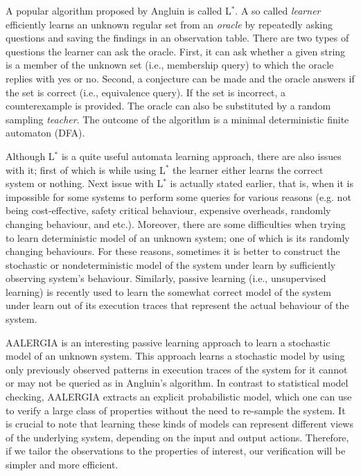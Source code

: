 \documentclass[
a4paper,
12pt
]{scrartcl}
\begin{document}

\par A popular algorithm proposed by Angluin \cite{Angluin.1987} is called L$^*$. A so called \textit{learner} efficiently learns an unknown regular set from an \textit{oracle} by repeatedly asking questions and saving the findings in an observation table. There are two types of questions the learner can ask the oracle. First, it can ask whether a given string is a member of the unknown set (i.e., membership query) to which the oracle replies with yes or no. Second, a conjecture can be made and the oracle answers if the set is correct (i.e., equivalence query). If the set is incorrect, a counterexample is provided. The oracle can also be substituted by a random sampling \textit{teacher}. The outcome of the algorithm is a minimal deterministic finite automaton (DFA).

\par Although L$^*$ is a quite useful automata learning approach, there are also issues with it; first of which is while using L$^*$ the learner either learns the correct system or nothing. Next issue with L$^*$ is actually stated earlier, that is, when it is impossible for some systems to perform some queries for various reasons (e.g. not being cost-effective, safety critical behaviour, expensive overheads, randomly changing behaviour, and etc.). Moreover, there are some difficulties when trying to learn deterministic model of an unknown system; one of which is its randomly changing behaviours. For these reasons, sometimes it is better to construct the stochastic or nondeterministic model of the system under learn by sufficiently observing system's behaviour. Similarly, passive learning (i.e., unsupervised learning) is recently used to learn the somewhat correct model of the system under learn out of its execution traces that represent the actual behaviour of the system.

\par AALERGIA \cite{Mao.} is an interesting passive learning approach to learn a stochastic model of an unknown system. This approach learns a stochastic model by using only previously observed patterns in execution traces of the system for it cannot or may not be queried as in Angluin's algorithm. In contrast to statistical model checking, AALERGIA extracts an explicit probabilistic model, which one can use to verify a large class of properties without the need to re-sample the system. It is crucial to note that learning these kinds of models can represent different views of the underlying system, depending on the input and output actions. Therefore, if we tailor the observations to the properties of interest, our verification will be simpler and more efficient.
\end{document}
